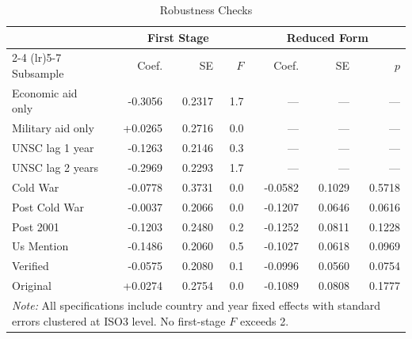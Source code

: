 \begin{table}[htbp]
\centering
\caption{Robustness Checks}
\label{tab:robustness}
\begin{tabular}{lrrrrrr}
\toprule
& \multicolumn{3}{c}{First Stage} & \multicolumn{3}{c}{Reduced Form} \\
\cmidrule(lr){2-4} \cmidrule(lr){5-7}
Subsample & Coef. & SE & $F$ & Coef. & SE & $p$ \\
\midrule
  Economic aid only         & -0.3056 & 0.2317 & 1.7 & — & — & — \\
  Military aid only         & +0.0265 & 0.2716 & 0.0 & — & — & — \\
  UNSC lag 1 year           & -0.1263 & 0.2146 & 0.3 & — & — & — \\
  UNSC lag 2 years          & -0.2969 & 0.2293 & 1.7 & — & — & — \\
  Cold War                  & -0.0778 & 0.3731 & 0.0 & -0.0582 & 0.1029 & 0.5718 \\
  Post Cold War             & -0.0037 & 0.2066 & 0.0 & -0.1207 & 0.0646 & 0.0616 \\
  Post 2001                 & -0.1203 & 0.2480 & 0.2 & -0.1252 & 0.0811 & 0.1228 \\
  Us Mention                & -0.1486 & 0.2060 & 0.5 & -0.1027 & 0.0618 & 0.0969 \\
  Verified                  & -0.0575 & 0.2080 & 0.1 & -0.0996 & 0.0560 & 0.0754 \\
  Original                  & +0.0274 & 0.2754 & 0.0 & -0.1089 & 0.0808 & 0.1777 \\
\bottomrule
\multicolumn{7}{p{0.85\textwidth}}{\footnotesize\textit{Note:} All specifications include country and year fixed effects with standard errors clustered at ISO3 level. No first-stage $F$ exceeds 2.}\\
\end{tabular}
\end{table}
